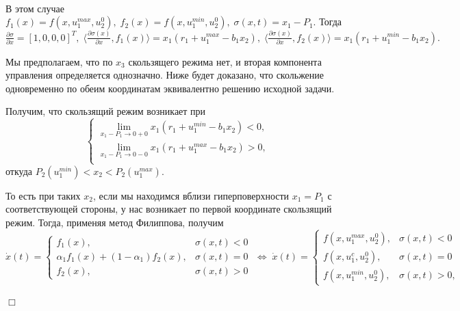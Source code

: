 \documentclass[11pt]{article}
\theoremstyle{definition}
\newenvironment{Proof}
{\par\noindent{\bf Доказательство.\\}} 
{\begin{flushright}$\Box$\end{flushright}}
\newcommand\dd[2]{\frac{\partial#1}{\partial#2}}
\begin{document}
\begin{Proof}\\
    \indent В этом случае 
    $f_1(x) = f(x, u_1^{max}, u_2^0), \; f_2(x) = f(x, u_1^{min}, u_2^0), \; \sigma(x,t) = x_1 - P_1.$
    Тогда $\dd{\sigma}{x} = [1,0,0,0]^T, \; \langle \dd{\sigma(x)}{x}, f_1(x) \rangle = x_1(r_1 + u_1^{max}  - b_1x_2), \; \langle \dd{\sigma(x)}{x}, f_2(x) \rangle = x_1(r_1 + u_1^{min}  - b_1x_2).$
    
    Мы предполагаем, что по $x_3$ скользящего режима нет, и вторая компонента управления определяется однозначно. Ниже будет доказано, что скольжение одновременно по обеим координатам эквивалентно решению исходной задачи.
    
    Получим, что скользящий режим возникает при 
    $$
    \left\{
    \begin{aligned}
    	\lim_{x_1 - P_1 \to 0 + 0} x_1(r_1 + u_1^{min} - b_1x_2) < 0, \\
    	\lim_{x_1 - P_1 \to 0 - 0} x_1(r_1 + u_1^{max} - b_1x_2) > 0, \\
    \end{aligned}
    \right.
    $$
    откуда $P_2(u_1^{min}) < x_2 < P_2(u_1^{max}).$
    
    То есть при таких $x_2$, если мы находимся вблизи гиперповерхности $x_1 = P_1$ с соответствующей стороны, у нас возникает по первой координате скользящий режим. Тогда, применяя метод Филиппова, получим 
    $$
    \dot x(t) = \begin{cases} f_1(x), & \sigma(x,t) < 0 \\ \alpha_1 f_1(x) + (1 - \alpha_1) f_2(x), & \sigma(x,t) = 0 \\ f_2(x), & \sigma(x,t) > 0\end{cases} \; \Leftrightarrow \; \dot x(t) = \begin{cases} f(x,u_1^{max}, u_2^0), & \sigma(x,t) < 0 \\ f(x, u_1^c, u_2^0), & \sigma(x,t) = 0 \\ f(x, u_1^{min}, u_2^0), & \sigma(x,t) > 0,\end{cases}
    $$
    

\end{Proof}
\end{document}
